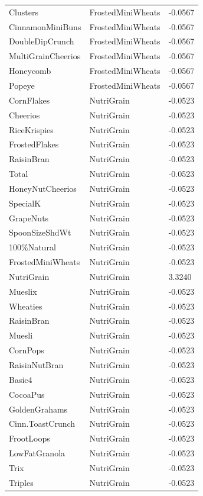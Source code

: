 \begin{table}[!htbp]
\begin{tabular}{lll}
\\
Clusters & FrostedMiniWheats & -0.0567
\\
CinnamonMiniBuns & FrostedMiniWheats & -0.0567
\\
DoubleDipCrunch & FrostedMiniWheats & -0.0567
\\
MultiGrainCheerios & FrostedMiniWheats & -0.0567
\\
Honeycomb & FrostedMiniWheats & -0.0567
\\
Popeye & FrostedMiniWheats & -0.0567
\\
CornFlakes & NutriGrain & -0.0523
\\
Cheerios & NutriGrain & -0.0523
\\
RiceKrispies & NutriGrain & -0.0523
\\
FrostedFlakes & NutriGrain & -0.0523
\\
RaisinBran & NutriGrain & -0.0523
\\
Total & NutriGrain & -0.0523
\\
HoneyNutCheerios & NutriGrain & -0.0523
\\
SpecialK & NutriGrain & -0.0523
\\
GrapeNuts & NutriGrain & -0.0523
\\
SpoonSizeShdWt & NutriGrain & -0.0523
\\
100\%Natural & NutriGrain & -0.0523
\\
FrostedMiniWheats & NutriGrain & -0.0523
\\
NutriGrain & NutriGrain & 3.3240
\\
Mueslix & NutriGrain & -0.0523
\\
Wheaties & NutriGrain & -0.0523
\\
RaisinBran & NutriGrain & -0.0523
\\
Muesli & NutriGrain & -0.0523
\\
CornPops & NutriGrain & -0.0523
\\
RaisinNutBran & NutriGrain & -0.0523
\\
Basic4 & NutriGrain & -0.0523
\\
CocoaPus & NutriGrain & -0.0523
\\
GoldenGrahams & NutriGrain & -0.0523
\\
Cinn.ToastCrunch & NutriGrain & -0.0523
\\
FrootLoops & NutriGrain & -0.0523
\\
LowFatGranola & NutriGrain & -0.0523
\\
Trix & NutriGrain & -0.0523
\\
Triples & NutriGrain & -0.0523
\\

\end{tabular}
\end{table}

